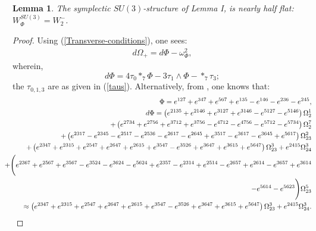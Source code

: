 \documentclass[a4paper,11pt,fleqn]{article}
\theoremstyle{plain}
\newtheorem{lemma}[theorem]{Lemma}
\theoremstyle{definition}
\begin{document}
\begin{lemma} 
\label{HalfFlatSymplecticSU3}
The symplectic $SU(3)$-structure of {\it Lemma I}, is nearly half flat: $W_\Phi^{SU(3)} = W_2^-$. 
\end{lemma}

\begin{proof}
Using (\ref{Transverse-conditions}), one sees:
\begin{eqnarray}
\label{dOmega+}
d\Omega_+ = d\Phi - \omega_\Phi^2,
\end{eqnarray}
wherein,
\begin{equation}
\label{dPhi-G2torsion}
d\Phi = 4\tau_0 *_7\Phi - 3\tau_1\wedge\Phi - *_7\tau_3;    
\end{equation}
the $\tau_{0,1,3}$ are as given in (\ref{taus}). Alternatively, from \cite{ACMS}, one knows that:
\begin{eqnarray}
\label{Phi-dPhi}
& & \hskip -0.3in \Phi= e^{127}+e^{347}+e^{567}+e^{135}-e^{146}-e^{236}-e^{245},\nonumber\\
& & \hskip -0.3in d\Phi= \left(e^{2135}+e^{2146}+e^{3127}+e^{3146}-e^{5127}-e^{5146}\right)\Omega^1_2 \nonumber\\
& & \hskip -0.3in+\left(e^{2734}+e^{2756}+e^{3712}+e^{3756}-e^{4712}-e^{4756}-e^{5712}-e^{5734}\right)\Omega^7_2 \nonumber\\
& & \hskip -0.3in + \left(e^{2317}-e^{2345}-e^{2517}-e^{2536}-e^{2617}-e^{2645}+e^{3517}-e^{3617}-e^{3645}+e^{5617}\right)\Omega^2_{23}\nonumber\\
& & \hskip -0.3in + \left(e^{2347}+e^{2315}+e^{2547}+e^{2647}+e^{2615}+e^{3547}-e^{3526}+e^{3647}+e^{3615}+e^{5647}\right)\Omega^3_{23}+e^{2415}\Omega^3_{24}\nonumber\\
& & \hskip -0.3in + \Biggl(e^{2367}+e^{2567}+e^{3567}-e^{3524}-e^{3624}-e^{5624}+e^{2357}-e^{2314}+e^{2514}-e^{2657}+e^{2614}-e^{3657}+e^{3614} \nonumber\\
& & \hskip -0.3in -e^{5614}-e^{5623}\Biggr)\Omega^5_{23}\nonumber\\
& & \hskip -0.3in \approx \left(e^{2347}+e^{2315}+e^{2547}+e^{2647}+e^{2615}+e^{3547}-e^{3526}+e^{3647}+e^{3615}+e^{5647}\right)\Omega^3_{23}+e^{2415}\Omega^3_{24}.
\end{eqnarray}



\end{proof}
\end{document}
